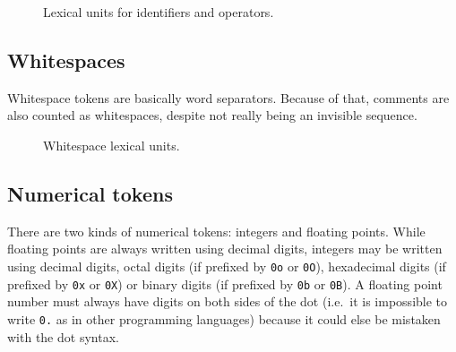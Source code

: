 \begin{figure}[H]
	\centering


	\caption{Lexical units for identifiers and operators.}
	\label{fig:zilch-grammar-lexical-identifiers-grammar}
\end{figure}

\subsection{Whitespaces}\label{subsec:zilch-grammar-lexical-whitespaces}

Whitespace tokens are basically word separators.
Because of that, comments are also counted as whitespaces, despite not really being an invisible sequence.

\begin{figure}[H]
	\centering


	\caption{Whitespace lexical units.}
	\label{fig:zilch-grammar-lexical-whitespaces-grammar}
\end{figure}

\subsection{Numerical tokens}\label{subsec:zilch-grammar-lexical-numbers}

There are two kinds of numerical tokens: integers and floating points.
While floating points are always written using decimal digits, integers may be written using decimal digits, octal digits (if prefixed by \verb|0o| or \verb|0O|), hexadecimal digits (if prefixed by \verb|0x| or \verb|0X|) or binary digits (if prefixed by \verb|0b| or \verb|0B|).
A floating point number must always have digits on both sides of the dot (i.e.\ it is impossible to write \verb|0.| as in other programming languages) because it could else be mistaken with the dot syntax.

